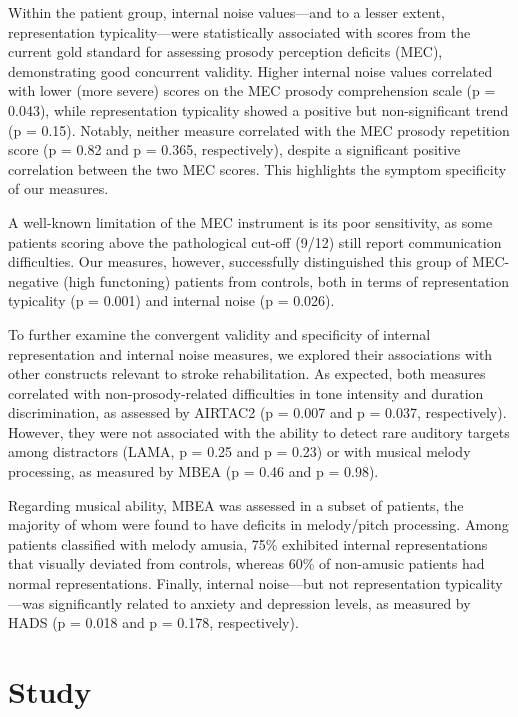 Within the patient group, internal noise values—and to a lesser extent, representation typicality—were statistically associated with scores from the current gold standard for assessing prosody perception deficits (MEC), demonstrating good concurrent validity. Higher internal noise values correlated with lower (more severe) scores on the MEC prosody comprehension scale (p = 0.043), while representation typicality showed a positive but non-significant trend (p = 0.15). Notably, neither measure correlated with the MEC prosody repetition score (p = 0.82 and p = 0.365, respectively), despite a significant positive correlation between the two MEC scores. This highlights the symptom specificity of our measures.

A well-known limitation of the MEC instrument is its poor sensitivity, as some patients scoring above the pathological cut-off (9/12) still report communication difficulties. Our measures, however, successfully distinguished this group of MEC-negative (high functoning) patients from controls, both in terms of representation typicality (p = 0.001) and internal noise (p = 0.026).

To further examine the convergent validity and specificity of internal representation and internal noise measures, we explored their associations with other constructs relevant to stroke rehabilitation. As expected, both measures correlated with non-prosody-related difficulties in tone intensity and duration discrimination, as assessed by AIRTAC2 (p = 0.007 and p = 0.037, respectively). However, they were not associated with the ability to detect rare auditory targets among distractors (LAMA, p = 0.25 and p = 0.23) or with musical melody processing, as measured by MBEA (p = 0.46 and p = 0.98).

Regarding musical ability, MBEA was assessed in a subset of patients, the majority of whom were found to have deficits in melody/pitch processing. Among patients classified with melody amusia, 75\% exhibited internal representations that visually deviated from controls, whereas 60\% of non-amusic patients had normal representations. Finally, internal noise—but not representation typicality—was significantly related to anxiety and depression levels, as measured by HADS (p = 0.018 and p = 0.178, respectively).

\section {Study} 



